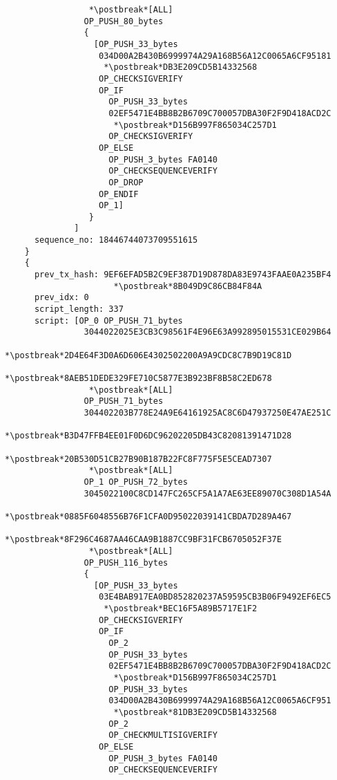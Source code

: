 \begin{lstlisting}
                 *\postbreak*[ALL]
                OP_PUSH_80_bytes
                {
                  [OP_PUSH_33_bytes
                   034D00A2B430B6999974A29A168B56A12C0065A6CF95181
                    *\postbreak*DB3E209CD5B14332568
                   OP_CHECKSIGVERIFY
                   OP_IF
                     OP_PUSH_33_bytes
                     02EF5471E4BB8B2B6709C700057DBA30F2F9D418ACD2C
                      *\postbreak*D156B997F865034C257D1
                     OP_CHECKSIGVERIFY
                   OP_ELSE
                     OP_PUSH_3_bytes FA0140
                     OP_CHECKSEQUENCEVERIFY
                     OP_DROP
                   OP_ENDIF
                   OP_1]
                 }
              ]
      sequence_no: 18446744073709551615
    }
    {
      prev_tx_hash: 9EF6EFAD5B2C9EF387D19D878DA83E9743FAAE0A235BF4
                      *\postbreak*8B049D9C86CB84F84A
      prev_idx: 0
      script_length: 337
      script: [OP_0 OP_PUSH_71_bytes
                3044022025E3CB3C98561F4E96E63A992895015531CE029B64
                 *\postbreak*2D4E64F3D0A6D606E4302502200A9A9CDC8C7B9D19C81D
                 *\postbreak*8AEB51DEDE329FE710C5877E3B923BF8B58C2ED678
                 *\postbreak*[ALL]
                OP_PUSH_71_bytes
                304402203B778E24A9E64161925AC8C6D47937250E47AE251C
                 *\postbreak*B3D47FFB4EE01F0D6DC96202205DB43C82081391471D28
                 *\postbreak*20B530D51CB27B90B187B22FC8F775F5E5CEAD7307
                 *\postbreak*[ALL]
                OP_1 OP_PUSH_72_bytes
                3045022100C8CD147FC265CF5A1A7AE63EE89070C308D1A54A
                 *\postbreak*0885F6048556B76F1CFA0D95022039141CBDA7D289A467
                 *\postbreak*8F296C4687AA46CAA9B1887CC9BF31FCB6705052F37E
                 *\postbreak*[ALL]
                OP_PUSH_116_bytes
                {
                  [OP_PUSH_33_bytes
                   03E4BAB917EA0BD852820237A59595CB3B06F9492EF6EC5
                    *\postbreak*BEC16F5A89B5717E1F2
                   OP_CHECKSIGVERIFY
                   OP_IF
                     OP_2
                     OP_PUSH_33_bytes
                     02EF5471E4BB8B2B6709C700057DBA30F2F9D418ACD2C
                      *\postbreak*D156B997F865034C257D1
                     OP_PUSH_33_bytes
                     034D00A2B430B6999974A29A168B56A12C0065A6CF951
                      *\postbreak*81DB3E209CD5B14332568
                     OP_2
                     OP_CHECKMULTISIGVERIFY
                   OP_ELSE
                     OP_PUSH_3_bytes FA0140
                     OP_CHECKSEQUENCEVERIFY

\end{lstlisting}

